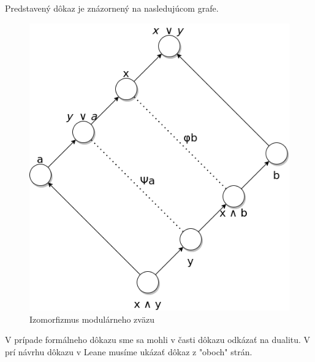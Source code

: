 \documentclass[a4paper,10pt,oneside]{report}%
\begin{document}
    Predstavený dôkaz je znázornený na nasledujúcom grafe.

\begin{figure}[!ht]
    \centering
    \includegraphics[scale=0.35]{modular_lattice_isomorphism.png}
    \caption{Izomorfizmus modulárneho zväzu}
\end{figure}

    V prípade formálneho dôkazu sme sa mohli v časti dôkazu odkázať na dualitu. 
    V prí návrhu dôkazu v Leane musíme ukázať dôkaz z "oboch" strán.
\end{document}
